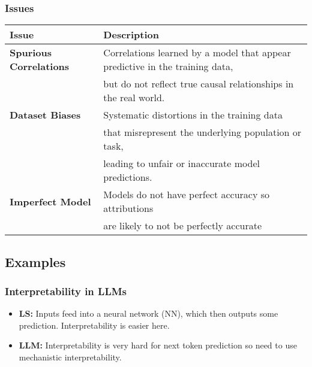 \subsubsection{Issues}
\begin{summary}
    \begin{center}
        \begin{tabular}{ll}
            \toprule
            \textbf{Issue} & \textbf{Description} \\
            \midrule
            \textbf{Spurious Correlations} & Correlations learned by a model that appear predictive in the training data, \\
            & but do not reflect true causal relationships in the real world. \\
            \midrule
            \textbf{Dataset Biases} & Systematic distortions in the training data \\
            & that misrepresent the underlying population or task, \\
            & leading to unfair or inaccurate model predictions. \\
            \midrule
            \textbf{Imperfect Model} & Models do not have perfect accuracy so attributions \\
            & are likely to not be perfectly accurate \\
            \bottomrule
        \end{tabular}
    \end{center}
\end{summary}
\newpage

\subsection{Examples}
\subsubsection{Interpretability in LLMs}
\begin{example}
    \begin{itemize}
        \item \textbf{LS:} Inputs feed into a neural network (NN), which then outputs some prediction. Interpretability is easier here.
        \item \textbf{LLM:} Interpretability is very hard for next token prediction so need to use mechanistic interpretability.
    \end{itemize}
\end{example}
\newpage

